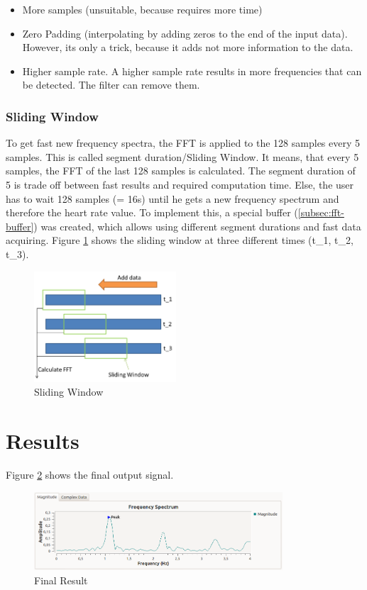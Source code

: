 \documentclass[notitlepage]{scrreprt}
\begin{document}
\begin{itemize}
	\item{More samples (unsuitable, because requires more time)}
	\item{Zero Padding (interpolating by adding zeros to the end of the input data). However, its only a trick, because it adds not more information to the data.}
	\item{Higher sample rate. A higher sample rate results in more frequencies that can be detected. The filter can remove them.}
\end{itemize}

\subsubsection{Sliding Window}
\label{subsubsec:sliding-window}
To get fast new frequency spectra, the FFT is applied to the 128 samples every 5 samples. This is called segment duration/Sliding Window. It means, that every 5 samples, the FFT of the last 128 samples is calculated. The segment duration of 5 is trade off between fast results and required computation time. Else, the user has to wait 128 samples (= 16s) until he gets a new frequency spectrum and therefore the heart rate value. To implement this, a special buffer (\ref{subsec:fft-buffer}) was created, which allows using different segment durations and fast data acquiring. Figure \ref{fig:sliding-window} shows the sliding window at three different times (t\_1, t\_2, t\_3).

\begin{figure}[H]
	\centering
	\includegraphics[width=200px]{images/slidingWindow.png}
	\caption{Sliding Window}
	\label{fig:sliding-window}
\end{figure}

\section{Results}
Figure \ref{fig:result} shows the final output signal.

\begin{figure}[H]
	\centering
	\includegraphics[width=350px]{images/withEverything.png}
	\caption{Final Result}
	\label{fig:result}
\end{figure}
\end{document}
